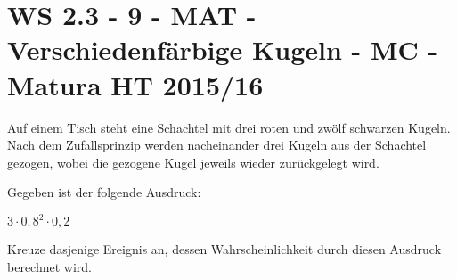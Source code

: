 \section{WS 2.3 - 9 - MAT - Verschiedenfärbige Kugeln - MC - Matura HT 2015/16}

\begin{beispiel}[WS 2.3]{1} %
Auf einem Tisch steht eine Schachtel mit drei roten und zwölf schwarzen Kugeln. Nach dem
Zufallsprinzip werden nacheinander drei Kugeln aus der Schachtel gezogen, wobei die gezogene
Kugel jeweils wieder zurückgelegt wird. \leer

Gegeben ist der folgende Ausdruck:

$3\cdot 0,8^2 \cdot 0,2$ \leer

Kreuze dasjenige Ereignis an, dessen Wahrscheinlichkeit durch diesen Ausdruck berechnet
wird.


\end{beispiel}